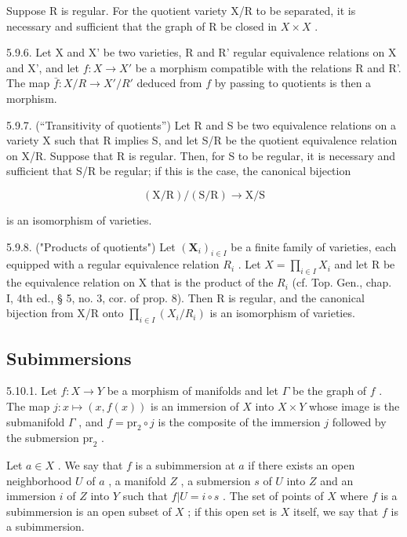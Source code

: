 Suppose R is regular. For the quotient variety X/R to be separated, it is necessary and sufficient that the graph of R be closed in \(X \times X\) .

5.9.6. Let X and X' be two varieties, R and R' regular equivalence relations on X and X', and let \(f: X \to X'\) be a morphism compatible with the relations R and R'. The map \(\bar{f}: X/R \to X'/R'\) deduced from \(f\) by passing to quotients is then a morphism.

5.9.7. (“Transitivity of quotients”) Let R and S be two equivalence relations on a variety X such that R implies S, and let S/R be the quotient equivalence relation on X/R. Suppose that R is regular. Then, for S to be regular, it is necessary and sufficient that S/R be regular; if this is the case, the canonical bijection

\[
(\mathrm{X} / \mathrm{R}) / (\mathrm{S} / \mathrm{R}) \rightarrow \mathrm{X} / \mathrm{S}
\]

is an isomorphism of varieties.

5.9.8. ("Products of quotients") Let \((\mathbf{X}_{i})_{i\in I}\) be a finite family of varieties, each equipped with a regular equivalence relation \(R_{i}\) . Let \(X = \prod_{i\in I} X_{i}\) and let R be the equivalence relation on X that is the product of the \(R_{i}\) (cf. Top. Gen., chap. I, 4th ed., § 5, no. 3, cor. of prop. 8). Then R is regular, and the canonical bijection from X/R onto \(\prod_{i\in I}(X_{i}/R_{i})\) is an isomorphism of varieties.

\subsection{Subimmersions}

5.10.1. Let \(f:X\to Y\) be a morphism of manifolds and let \(\Gamma\) be the graph of \(f\) . The map \(j:x\mapsto(x,f(x))\) is an immersion of \(X\) into \(X\times Y\) whose image is the submanifold \(\Gamma\) , and \(f=\mathrm{pr}_{2}\circ j\) is the composite of the immersion \(j\) followed by the submersion \(\mathrm{pr}_{2}\) .

Let \(a \in X\) . We say that \(f\) is a subimmersion at \(a\) if there exists an open neighborhood \(U\) of \(a\) , a manifold \(Z\) , a submersion \(s\) of \(U\) into \(Z\) and an immersion \(i\) of \(Z\) into \(Y\) such that \(f|U = i \circ s\) . The set of points of \(X\) where \(f\) is a subimmersion is an open subset of \(X\) ; if this open set is \(X\) itself, we say that \(f\) is a subimmersion.

